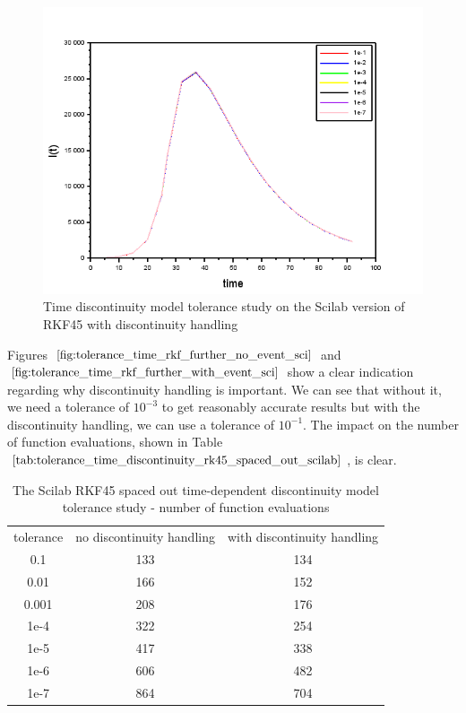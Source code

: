 \begin{figure}[H]
\centering
\includegraphics[width=0.7\linewidth]{./figures/tolerance_time_rkf_further_with_event_sci}
\caption{Time discontinuity model tolerance study on the Scilab version of RKF45 with discontinuity handling}
\label{fig:tolerance_time_rkf_further_with_event_sci}
\end{figure}

Figures $\ref{fig:tolerance_time_rkf_further_no_event_sci}$ and $\ref{fig:tolerance_time_rkf_further_with_event_sci}$ show a clear indication regarding why discontinuity handling is important. We can see that without it, we need a tolerance of $10^{-3}$ to get reasonably accurate results but with the discontinuity handling, we can use a tolerance of $10^{-1}$. The impact on the number of function evaluations, shown in Table $\ref{tab:tolerance_time_discontinuity_rk45_spaced_out_scilab}$, is clear.

\begin{table}[H]
\caption {The Scilab RKF45 spaced out time-dependent discontinuity model tolerance study - number of function evaluations} 
\label{tab:tolerance_time_discontinuity_rk45_spaced_out_scilab} 
\begin{center}
\begin{tabular}{ c c c }
tolerance & no discontinuity handling & with discontinuity handling\\ 
0.1 & 133 & 134 \\
0.01 & 166 & 152 \\
0.001 & 208 & 176 \\
1e-4 & 322 & 254 \\
1e-5 & 417 & 338 \\
1e-6 & 606 & 482 \\
1e-7 & 864 & 704 \\
\end{tabular}
\end{center}
\end{table}

